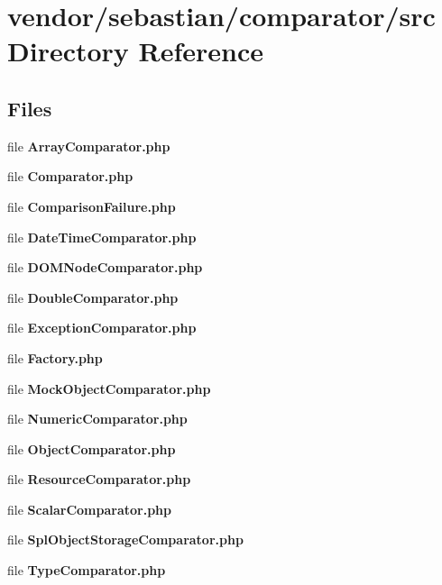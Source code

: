 \section{vendor/sebastian/comparator/src Directory Reference}
\label{dir_2ed35ba4b21f84fa96de6014c377d390}
\subsection*{Files}
\begin{DoxyCompactItemize}
\item 
file {\bf Array\+Comparator.\+php}
\item 
file {\bf Comparator.\+php}
\item 
file {\bf Comparison\+Failure.\+php}
\item 
file {\bf Date\+Time\+Comparator.\+php}
\item 
file {\bf D\+O\+M\+Node\+Comparator.\+php}
\item 
file {\bf Double\+Comparator.\+php}
\item 
file {\bf Exception\+Comparator.\+php}
\item 
file {\bf Factory.\+php}
\item 
file {\bf Mock\+Object\+Comparator.\+php}
\item 
file {\bf Numeric\+Comparator.\+php}
\item 
file {\bf Object\+Comparator.\+php}
\item 
file {\bf Resource\+Comparator.\+php}
\item 
file {\bf Scalar\+Comparator.\+php}
\item 
file {\bf Spl\+Object\+Storage\+Comparator.\+php}
\item 
file {\bf Type\+Comparator.\+php}
\end{DoxyCompactItemize}
